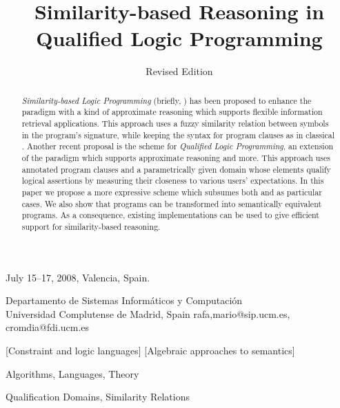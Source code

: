\documentclass{sigplanconf}
\theoremstyle{definition}
\theoremstyle{plain}
\begin{document}
 {July 15--17, 2008, Valencia, Spain.}

           

\title{Similarity-based Reasoning in Qualified Logic Programming}
\subtitle{Revised Edition}

           {Departamento de Sistemas Inform\'aticos y Computaci\'on \\ Universidad Complutense de Madrid, Spain}
           {rafa,mario@sip.ucm.es, cromdia@fdi.ucm.es}

\maketitle

\begin{abstract}
{\em Similarity-based Logic Programming} (briefly, ) has been proposed to enhance the  paradigm with a kind of approximate reasoning which supports flexible information retrieval applications. This approach uses a fuzzy similarity relation  between symbols in the program's signature,  while keeping the syntax for program  clauses as in classical . Another recent proposal is the   scheme for {\em Qualified Logic Programming}, an extension of the  paradigm which supports approximate reasoning and more. This approach uses annotated program clauses and a parametrically given domain   whose elements  qualify logical assertions by measuring their closeness to various users' expectations. In this paper we propose  a more expressive scheme  which subsumes both  and  as particular cases. We also show that  programs can be transformed into semantically equivalent  programs.  As a consequence, existing  implementations can be used to give efficient support for similarity-based reasoning.
\end{abstract}

[Constraint and logic languages]
[Algebraic approaches to semantics]

\terms Algorithms, Languages, Theory

\keywords
Qualification Domains, Similarity Relations
\end{document}
